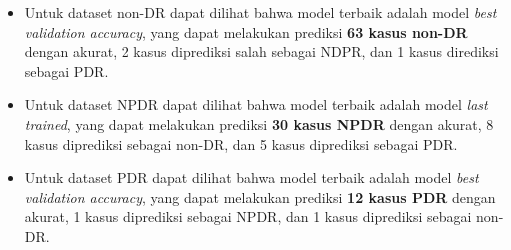 \begin{itemize}
	\item Untuk dataset non-DR dapat dilihat bahwa model terbaik adalah model \emph{best validation accuracy}, yang dapat melakukan prediksi \textbf{63 kasus non-DR} dengan akurat, 2 kasus diprediksi salah sebagai NDPR, dan 1 kasus dirediksi sebagai PDR.
	\item Untuk dataset NPDR dapat dilihat bahwa model terbaik adalah model \emph{last trained}, yang dapat melakukan prediksi \textbf{30 kasus NPDR} dengan akurat, 8 kasus diprediksi sebagai non-DR, dan 5 kasus diprediksi sebagai PDR.
	\item Untuk dataset PDR dapat dilihat bahwa model terbaik adalah model \emph{best validation accuracy}, yang dapat melakukan prediksi \textbf{12 kasus PDR} dengan akurat, 1 kasus diprediksi sebagai NPDR, dan 1 kasus diprediksi sebagai non-DR.
\end{itemize}
\pagebreak

